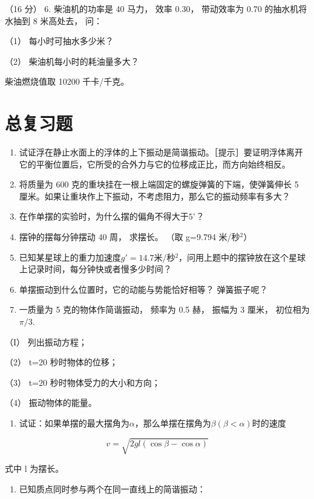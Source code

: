 （16 分） 6. 柴油机的功率是 40 马力， 效率 0.30， 带动效率为 0.70
的抽水机将水抽到 8 米高处去， 问：

（1） 每小时可抽水多少米？

（2） 柴油机每小时的耗油量多大？

柴油燃烧值取 10200 千卡/千克。

\chapter{总复习题}\label{ux603bux590dux4e60ux9898}

\begin{enumerate}
\def\labelenumi{\arabic{enumi}.}
\item
  试证浮在静止水面上的浮体的上下振动是简谐振动。［提示］要证明浮体离开它的平衡位置后，它所受的合外力与它的位移成正比，而方向始终相反。
\item
  将质量为 600 克的重块挂在一根上端固定的螺旋弹簧的下端，使弹簧伸长 5
  厘米。如果让重块作上下振动，不考虑阻力，那么它的振动频率有多大？
\item
  在作单摆的实验时，为什么摆的偏角不得大于\(5^{\circ}\)？
\item
  摆钟的摆每分钟摆动 40 周， 求摆长。 （取 g=9.794 米/秒\(^{2}\)）
\item
  已知某星球上的重力加速度\(g' = 14.7\)米/秒\(^{2}\)，问用上题中的摆钟放在这个星球上记录时间，每分钟快或者慢多少时间？
\item
  单摆振动到什么位置时，它的动能与势能恰好相等？ 弹簧振子呢？
\item
  一质量为 5 克的物体作简谐振动， 频率为 0.5 赫， 振幅为 3 厘米，
  初位相为\(\pi / 3\).
\end{enumerate}

（I） 列出振动方程；

（2） t=20 秒时物体的位移；

（3） t=20 秒时物体受力的大小和方向；

（4） 振动物体的能量。

\begin{enumerate}
\def\labelenumi{\arabic{enumi}.}
\setcounter{enumi}{7}
\tightlist
\item
  试证：如果单摆的最大摆角为\(\alpha\)，那么单摆在摆角为\(\beta (\beta < \alpha)\)时的速度
\end{enumerate}

\[
v = \sqrt {2 g l (\cos \beta - \cos \alpha)}
\]

式中 l 为摆长。

\begin{enumerate}
\def\labelenumi{\arabic{enumi}.}
\setcounter{enumi}{8}
\tightlist
\item
  已知质点同时参与两个在同一直线上的简谐振动：
\end{enumerate}

